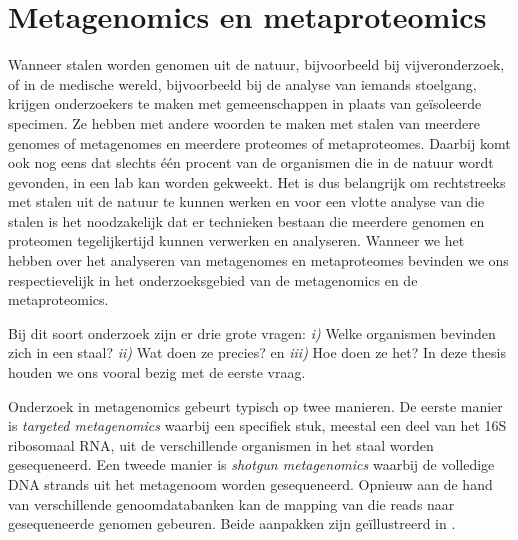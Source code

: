 \section{Metagenomics en metaproteomics} 

Wanneer stalen worden genomen uit de natuur, bijvoorbeeld bij vijveronderzoek,
of in de medische wereld, bijvoorbeeld bij de analyse van iemands stoelgang,
krijgen onderzoekers te maken met gemeenschappen in plaats van geïsoleerde
specimen. Ze hebben met andere woorden te maken met stalen van meerdere genomes
of metagenomes en meerdere proteomes of metaproteomes. Daarbij komt ook nog eens
dat slechts één procent van de organismen die in de natuur wordt gevonden, in
een lab kan worden gekweekt. Het is dus belangrijk om rechtstreeks met stalen
uit de natuur te kunnen werken en voor een vlotte analyse van die stalen is het
noodzakelijk dat er technieken bestaan die meerdere genomen en proteomen
tegelijkertijd kunnen verwerken en analyseren. Wanneer we het hebben over het
analyseren van metagenomes en metaproteomes bevinden we ons respectievelijk in
het onderzoeksgebied van de metagenomics en de metaproteomics.

Bij dit soort onderzoek zijn er drie grote vragen: \textit{i)} Welke organismen
bevinden zich in een staal? \textit{ii)} Wat doen ze precies? en \textit{iii)}
Hoe doen ze het? In deze thesis houden we ons vooral bezig met de eerste vraag.

Onderzoek in metagenomics gebeurt typisch op twee manieren. De eerste manier is
\emph{targeted metagenomics} waarbij een specifiek stuk, meestal een deel van
het 16S ribosomaal RNA, uit de verschillende organismen in het staal worden
gesequeneerd. Een tweede manier is \emph{shotgun metagenomics} waarbij de
volledige DNA strands uit het metagenoom worden gesequeneerd. Opnieuw aan de
hand van verschillende genoomdatabanken kan de mapping van die reads naar
gesequeneerde genomen gebeuren. Beide aanpakken zijn geïllustreerd in
.

